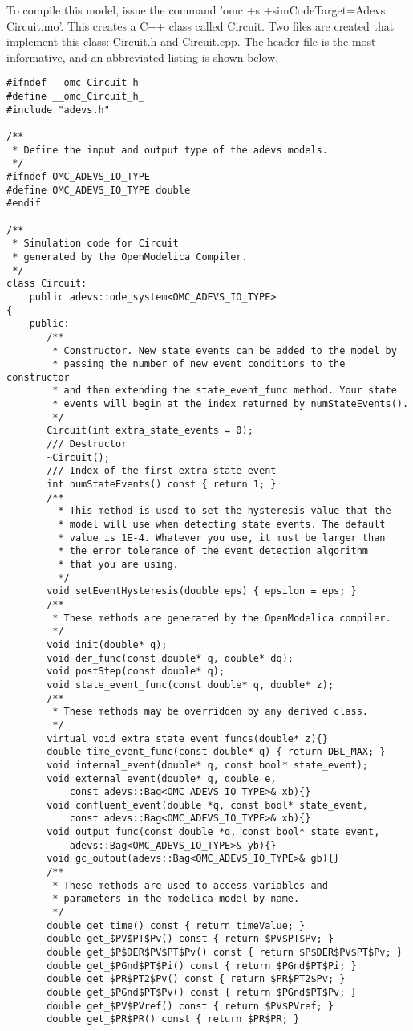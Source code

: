 To compile this model, issue the command 'omc +s +simCodeTarget=Adevs Circuit.mo'. This creates a C++ class called Circuit. Two files are created that implement this class: Circuit.h and Circuit.cpp. The header file is the most informative, and an abbreviated listing is shown below.
\begin{verbatim}
#ifndef __omc_Circuit_h_
#define __omc_Circuit_h_
#include "adevs.h"

/**
 * Define the input and output type of the adevs models.
 */
#ifndef OMC_ADEVS_IO_TYPE
#define OMC_ADEVS_IO_TYPE double
#endif

/**
 * Simulation code for Circuit
 * generated by the OpenModelica Compiler.
 */
class Circuit:
    public adevs::ode_system<OMC_ADEVS_IO_TYPE>
{
    public:
       /**
        * Constructor. New state events can be added to the model by
        * passing the number of new event conditions to the constructor
        * and then extending the state_event_func method. Your state
        * events will begin at the index returned by numStateEvents().
        */
       Circuit(int extra_state_events = 0);
       /// Destructor
       ~Circuit();
       /// Index of the first extra state event
       int numStateEvents() const { return 1; }
       /**
         * This method is used to set the hysteresis value that the
         * model will use when detecting state events. The default
         * value is 1E-4. Whatever you use, it must be larger than
         * the error tolerance of the event detection algorithm
         * that you are using.
         */
       void setEventHysteresis(double eps) { epsilon = eps; }
       /**
        * These methods are generated by the OpenModelica compiler.
        */
       void init(double* q);
       void der_func(const double* q, double* dq);
       void postStep(const double* q);
       void state_event_func(const double* q, double* z);
       /**
        * These methods may be overridden by any derived class.
        */
       virtual void extra_state_event_funcs(double* z){}
       double time_event_func(const double* q) { return DBL_MAX; }
       void internal_event(double* q, const bool* state_event);
       void external_event(double* q, double e,
           const adevs::Bag<OMC_ADEVS_IO_TYPE>& xb){}
       void confluent_event(double *q, const bool* state_event,
           const adevs::Bag<OMC_ADEVS_IO_TYPE>& xb){}
       void output_func(const double *q, const bool* state_event,
           adevs::Bag<OMC_ADEVS_IO_TYPE>& yb){}
       void gc_output(adevs::Bag<OMC_ADEVS_IO_TYPE>& gb){}
       /**
        * These methods are used to access variables and
        * parameters in the modelica model by name.
        */
       double get_time() const { return timeValue; }
       double get_$PV$PT$Pv() const { return $PV$PT$Pv; }
       double get_$P$DER$PV$PT$Pv() const { return $P$DER$PV$PT$Pv; }
       double get_$PGnd$PT$Pi() const { return $PGnd$PT$Pi; }
       double get_$PR$PT2$Pv() const { return $PR$PT2$Pv; }
       double get_$PGnd$PT$Pv() const { return $PGnd$PT$Pv; }
       double get_$PV$PVref() const { return $PV$PVref; }
       double get_$PR$PR() const { return $PR$PR; }
       

\end{verbatim}
